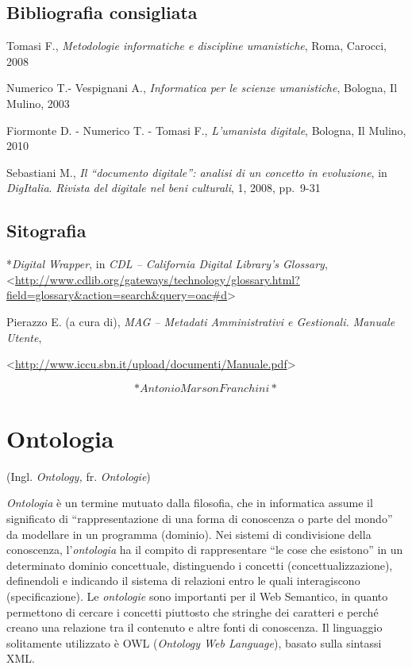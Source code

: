 \documentclass[
  b5paper,
  twoside,
  11pt,
  chapterprefix=false,
  bibliography=totocnumbered,
  parskip=0]{scrbook}
\begin{document}
\hypertarget{bibliografia-consigliata-17}{%
\section*{Bibliografia consigliata}\label{bibliografia-consigliata-17}}

Tomasi F., \emph{Metodologie informatiche e discipline umanistiche}, Roma,
Carocci, 2008

Numerico T.- Vespignani A., \emph{Informatica per le scienze umanistiche},
Bologna, Il Mulino, 2003

Fiormonte D. - Numerico T. - Tomasi F., \emph{L'umanista digitale}, Bologna,
Il Mulino, 2010

Sebastiani M., \emph{Il \enquote{documento digitale}: analisi di un concetto in
evoluzione}, in \emph{DigItalia}. \emph{Rivista del digitale nel beni culturali},
1, 2008, pp.~9-31

\hypertarget{sitografia-23}{%
\section*{Sitografia}\label{sitografia-23}}

*\emph{Digital Wrapper}, in \emph{CDL -- California Digital Library's Glossary},
\textless{}\href{http://www.cdlib.org/gateways/technology/glossary.html?field=glossary\&action=search\&query=oac\#d}{{http://www.cdlib.org/gateways/technology/glossary.html?field=glossary\&action=search\&query=oac\#d}}\textgreater{}

Pierazzo E. (a cura di), \emph{MAG -- Metadati Amministrativi e Gestionali.
Manuale Utente},

\textless{}{\url{http://www.iccu.sbn.it/upload/documenti/Manuale.pdf}\textgreater{}}

\[*Antonio Marson Franchini*\]

\hypertarget{ontologia}{%
\chapter{Ontologia}\label{ontologia}}

(Ingl. \emph{Ontology,} fr. \emph{Ontologie})

\emph{Ontologia} è un termine mutuato dalla filosofia, che in informatica
assume il significato di \enquote{rappresentazione di una forma di conoscenza o
parte del mondo} da modellare in un programma (dominio). Nei sistemi di
condivisione della conoscenza, l'\emph{ontologia} ha il compito di
rappresentare \enquote{le cose che esistono} in un determinato dominio
concettuale, distinguendo i concetti (concettualizzazione), definendoli
e indicando il sistema di relazioni entro le quali interagiscono
(specificazione). Le \emph{ontologie} sono importanti per il Web Semantico,
in quanto permettono di cercare i concetti piuttosto che stringhe dei
caratteri e perché creano una relazione tra il contenuto e altre fonti
di conoscenza. Il linguaggio solitamente utilizzato è OWL (\emph{Ontology Web
Language}), basato sulla sintassi XML.
\end{document}
